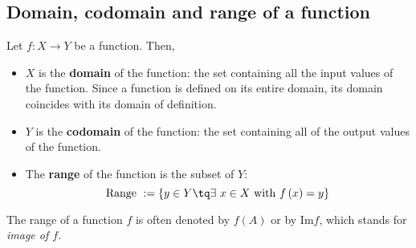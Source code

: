 \subsection{Domain, codomain and range of a function}
\begin{definition}
    Let $f:X\to Y$ be a function. Then, 
    \begin{itemize}
        \item $X$ is the \textbf{domain} of the function: the set containing all the input values of the function. Since a function is defined on its entire domain, its domain coincides with its domain of definition.
        \item $Y$ is the \textbf{codomain} of the function: the set containing all of the output values of the function.
        \item The \textbf{range} of the function is the subset of $Y$:
            \begin{equation}
                \textrm{Range }:=\{y\in Y\tq \exists\ x\in X \textrm{ with } f\left( x \right) = y\} 
            \end{equation}
    \end{itemize}

\end{definition}
\begin{notation}
    The range of a function $f$ is often denoted by $f\left( A \right) $ or by Im$f$, which stands for \textit{image of $f$}.
\end{notation}

\newpage
